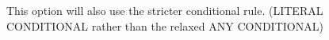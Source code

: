 This option will also use the stricter conditional rule. (LITERAL
\flowsto{} CONDITIONAL rather than the relaxed ANY \flowsto{} CONDITIONAL)



